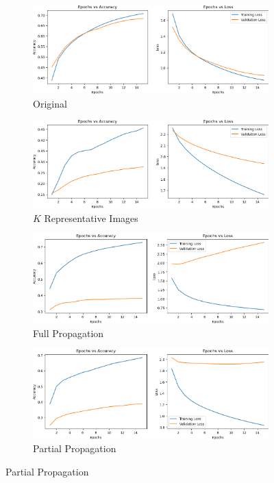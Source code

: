 \documentclass[10pt]{article}
\begin{document}
    \begin{figure}[!h]
        \centering
        \begin{subfigure}[b]{0.48\textwidth}
            \centering
            \caption{Original}
            \includegraphics[width=\textwidth]{Overhead - Model 1.png}
        \end{subfigure}
        \begin{subfigure}[b]{0.48\textwidth}
            \centering
            \caption{$K$ Representative Images}
            \includegraphics[width=\textwidth]{Overhead - Model 2.png}
        \end{subfigure}
        \begin{subfigure}[b]{0.48\textwidth}
            \centering
            \caption{Full Propagation}
            \includegraphics[width=\textwidth]{Overhead - Model 3.png}
        \end{subfigure}
        \begin{subfigure}[b]{0.48\textwidth}
            \centering
            \caption{Partial Propagation}
            \includegraphics[width=\textwidth]{Overhead - Model 4.png}
        \end{subfigure}
    \end{figure}
\end{document}
